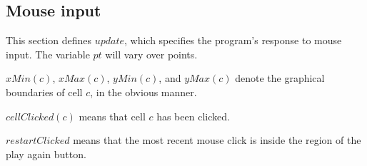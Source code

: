 \documentclass{led_doc}
\begin{document}
\begin{ledCmnt}
\section{Mouse input}

This section defines $update$, which specifies the program's response to mouse
input. The variable $pt$ will vary over points.

$xMin(c)$, $xMax(c)$, $yMin(c)$, and $yMax(c)$ denote the graphical boundaries of
cell $c$, in the obvious manner.
\end{ledCmnt}

\begin{ledDef}
\end{ledDef}

\begin{ledDef}
\end{ledDef}

\begin{ledDef}
\end{ledDef}

\begin{ledDef}
\end{ledDef}

\begin{ledCmnt}
$cellClicked(c)$ means that cell $c$ has been clicked.
\end{ledCmnt}

\begin{ledDef}
\end{ledDef}

\begin{ledCmnt}
$restartClicked$ means that the most recent mouse click is inside the region of the play again button.
\end{ledCmnt}

\begin{ledDef}
\end{ledDef}
\end{document}
